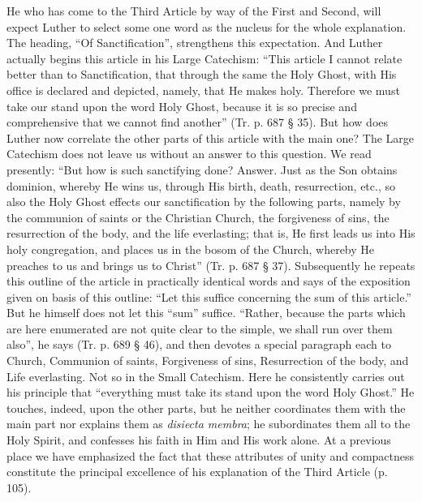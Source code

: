 He who has come to the Third Article by way of the First and Second, will expect Luther to select some one word as the nucleus for the whole explanation. The heading, “Of Sanctification”, strengthens this expectation. And Luther actually begins this article in his Large Catechism: “This article I cannot relate better than to Sanctification, that through the same the Holy Ghost, with His
office is declared and depicted, namely, that He makes holy. Therefore we must take our stand upon the word Holy Ghost, because it is so precise and comprehensive that we cannot find another” (Tr. p. 687 § 35). But how does Luther now correlate the other parts of this article with the main one? The Large Catechism does not leave us without an answer to this question. We read presently: “But how is such sanctifying done? Answer. Just as the Son obtains dominion, whereby He wins us, through His birth, death, resurrection, etc., so also the Holy Ghost effects our sanctification by the following parts, namely by the communion of saints or the Christian Church, the forgiveness of sins, the resurrection of the body, and the life everlasting; that is, He first leads us into His holy congregation, and places us in the bosom of the Church, whereby He preaches to us and brings us to Christ” (Tr. p. 687 § 37). Subsequently he repeats this outline of the article in practically identical words and says of the exposition given on basis of this outline: “Let this suffice concerning the sum of this article.” But he himself does not let this “sum” suffice. “Rather, because the parts which are here enumerated are not quite clear to the simple, we shall run over them also”, he says (Tr. p. 689 § 46), and then devotes a special paragraph each to Church, Communion of saints, Forgiveness of sins, Resurrection of the body, and Life everlasting. Not so in the Small Catechism. Here he consistently carries out his principle that “everything must take its stand upon the word Holy Ghost.” He touches, indeed, upon the other parts, but he neither coordinates them with the main part nor explains them as \emph{disiecta membra}; he subordinates them all to the Holy Spirit, and confesses his faith in Him and His work alone. At a previous place we have emphasized the fact that these attributes of unity and compactness constitute the principal excellence of his explanation of the Third Article (p. 105).

